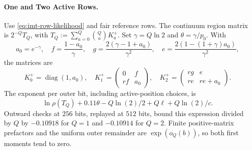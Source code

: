 \paragraph{One and Two Active Rows.}
Use \eqref{eq:imt-row-likelihood} and fair reference rows. The continuum
region matrix is $2^{-Q}T_Q$, with
$T_Q:=\sum_{a=0}^Q\binom Qa K_a^+$. Set $\gamma=Q\ln2$ and
$\theta=\gamma/p_0$. With
\[
 a_0=e^{-\gamma},\quad f=\frac{1-a_0}{\gamma},\quad
 g=\frac{2(\gamma-1+a_0)}{\gamma^2},\quad
 e=\frac{2(1-(1+\gamma)a_0)}{\gamma^2},
\]
the matrices are
\[
 K_0^+=\operatorname{diag}(1,a_0),\quad
 K_1^+=\begin{pmatrix}0&f\\rf&a_0\end{pmatrix},\quad
 K_2^+=\begin{pmatrix}rg&e\\re&re+a_0\end{pmatrix}.
\]
The exponent per outer bit, including active-position choices, is
\[
 \ln\rho(T_Q)+0.11\theta-Q\ln(2)/2+Q\ell+Q\ln(2)/c.
\]
Outward checks at $256$ bits, replayed at $512$ bits, bound this expression
divided by $Q$ by $-0.10918$ for $Q=1$ and $-0.10914$ for $Q=2$.
Finite positive-matrix prefactors and the uniform outer remainder are
$\exp(o_Q(b))$, so both first moments tend to zero.

